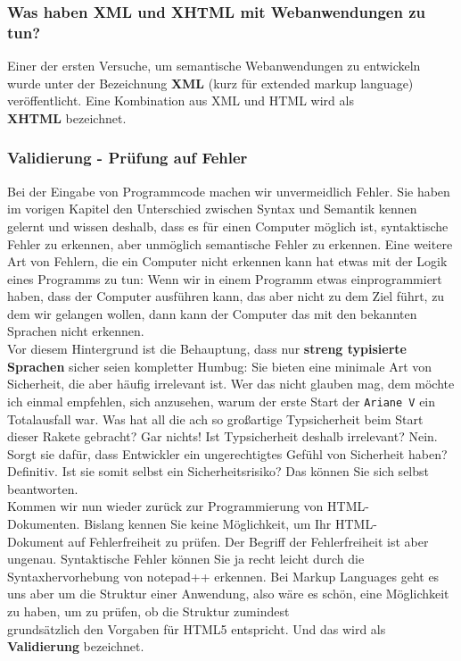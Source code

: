 \subsubsection{Was haben XML und XHTML mit Webanwendungen zu tun?}

Einer der ersten Versuche, um semantische Webanwendungen zu entwickeln wurde unter der Bezeichnung \textbf{XML} (kurz für extended markup language) veröffentlicht. Eine Kombination aus XML und HTML wird als\\ \textbf{XHTML} bezeichnet.

\subsubsection{Validierung - Prüfung auf Fehler}

Bei der Eingabe von Programmcode machen wir unvermeidlich Fehler. Sie haben im vorigen Kapitel den Unterschied zwischen Syntax und Semantik kennen gelernt und wissen deshalb, dass es für einen Computer möglich ist, syntaktische Fehler zu erkennen, aber unmöglich semantische Fehler zu erkennen. Eine weitere Art von Fehlern, die ein Computer nicht erkennen kann hat etwas mit der Logik eines Programms zu tun: Wenn wir in einem Programm etwas einprogrammiert haben, dass der Computer ausführen kann, das aber nicht zu dem Ziel führt, zu dem wir gelangen wollen, dann kann der Computer das mit den bekannten Sprachen nicht erkennen.\\

Vor diesem Hintergrund ist die Behauptung, dass nur \textbf{streng typisierte Sprachen} sicher seien kompletter Humbug: Sie bieten eine minimale Art von Sicherheit, die aber häufig irrelevant ist. Wer das nicht glauben mag, dem möchte ich einmal empfehlen, sich anzusehen, warum der erste Start der \verb|Ariane V| ein Totalausfall war. Was hat all die ach so großartige Typsicherheit beim Start dieser Rakete gebracht? Gar nichts! Ist Typsicherheit deshalb irrelevant? Nein. Sorgt sie dafür, dass Entwickler ein ungerechtigtes Gefühl von Sicherheit haben? Definitiv. Ist sie somit selbst ein Sicherheitsrisiko? Das können Sie sich selbst beantworten.\\

Kommen wir nun wieder zurück zur Programmierung von HTML-\\Dokumenten. Bislang kennen Sie keine Möglichkeit, um Ihr HTML-\\Dokument auf Fehlerfreiheit zu prüfen. Der Begriff der Fehlerfreiheit ist aber ungenau. Syntaktische Fehler können Sie ja recht leicht durch die Syntaxhervorhebung von notepad++ erkennen. Bei Markup Languages geht es uns aber um die Struktur einer Anwendung, also wäre es schön, eine Möglichkeit zu haben, um zu prüfen, ob die Struktur zumindest \\grundsätzlich den Vorgaben für HTML5 entspricht. Und das wird als \textbf{Validierung} bezeichnet.\\

